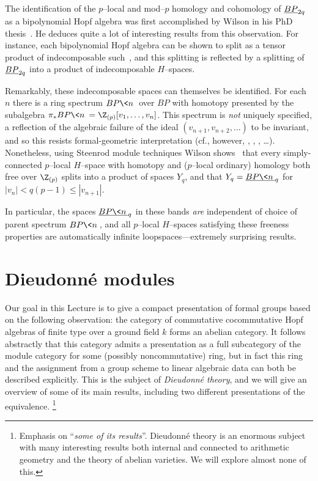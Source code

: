 \begin{remark}\label{WilsonSpaces}
The identification of the \(p\)--local and mod--\(p\) homology and cohomology of \(\OS{BP}{2q}\) as a bipolynomial Hopf algebra was first accomplished by Wilson in his PhD thesis~\cite[Theorem 3.3]{WilsonThesisI}.
He deduces quite a lot of interesting results from this observation.
For instance, each bipolynomial Hopf algebra can be shown to split as a tensor product of indecomposable such~\cite[Proposition 3.5]{WilsonThesisI}, and this splitting is reflected by a splitting of \(\OS{BP}{2q}\) into a product of indecomposable \(H\)--spaces.

Remarkably, these indecomposable spaces can themselves be identified.
For each \(n\) there is a ring spectrum \(BP\<n\>\) over \(BP\) with homotopy presented by the subalgebra \(\pi_* BP\<n\> = \Z_{(p)}[v_1, \ldots, v_n]\).
This spectrum is \emph{not} uniquely specified, a reflection of the algebraic failure of the ideal \((v_{n+1}, v_{n+2}, \ldots)\) to be invariant, and so this resists formal-geometric interpretation (cf., however, \cite{AngeltveitLind}, \cite{LawsonNaumann}, \cite{StricklandProductsOnModules}, \ldots).
Nonetheless, using Steenrod module techniques Wilson shows~\cite[Section 6]{WilsonThesisII} that every simply-connected \(p\)--local \(H\)--space with homotopy and (\(p\)--local ordinary) homology both
free over \(\Z_{(p)}\) splits into a product of spaces \(Y_q\), and that \(Y_q = \OS{BP\<n\>}{q}\) for \(|v_n| < q(p-1) \le |v_{n+1}|\).

In particular, the spaces \(\OS{BP\<n\>}{q}\) in these bands \emph{are} independent of choice of parent spectrum \(BP\<n\>\), and all \(p\)--local \(H\)--spaces satisfying these freeness properties are automatically infinite loopspaces---extremely surprising results.
\end{remark}










\section{Dieudonn\'e modules}\label{SectionDieudonneModules}

Our goal in this Lecture is to give a compact presentation of formal groups based on the following observation: the category of commutative cocommutative Hopf algebras of finite type over a ground field \(k\) forms an abelian category.
It follows abstractly that this category admits a presentation as a full subcategory of the module category for some (possibly noncommutative) ring, but in fact this ring and the assignment from a group scheme to linear algebraic data can both be described explicitly.
This is the subject of \textit{Dieudonn\'e theory}, and we will give an overview of some of its main results, including two different presentations of the equivalence.%
\footnote{%
Emphasis on ``\emph{some of its results}''.
Dieudonn\'e theory is an enormous subject with many interesting results both internal and connected to arithmetic geometry and the theory of abelian varieties.
We will explore almost none of this.
}

